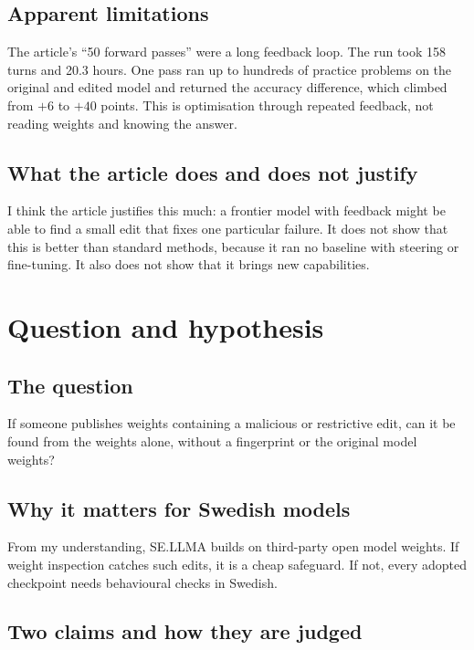 \documentclass[11pt,a4paper]{article}
\begin{document}
\subsection{Apparent limitations}

The article's ``50 forward passes'' were a long feedback loop. The run took 158 turns and 20.3
hours. One pass ran up to hundreds of practice problems on the original and edited model and
returned the accuracy difference, which climbed from $+6$ to $+40$ points. This is optimisation
through repeated feedback, not reading weights and knowing the answer.

\subsection{What the article does and does not justify}

I think the article justifies this much: a frontier model with feedback might be able to find a
small edit that fixes one particular failure. It does not show that this is better than standard
methods, because it ran no baseline with steering or fine-tuning. It also does not show that it
brings new capabilities.

\section{Question and hypothesis}

\subsection{The question}

If someone publishes weights containing a malicious or restrictive edit, can it be found from the
weights alone, without a fingerprint or the original model weights?

\subsection{Why it matters for Swedish models}

From my understanding, SE.LLMA builds on third-party open model weights. If weight inspection
catches such edits, it is a cheap safeguard. If not, every adopted checkpoint needs behavioural
checks in Swedish.

\subsection{Two claims and how they are judged}
\end{document}
